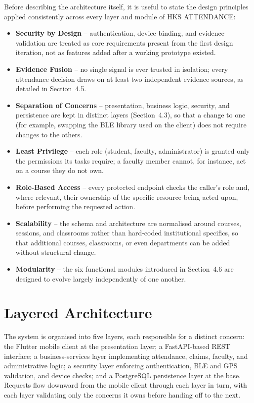 \documentclass[12pt, a4paper, oneside]{report}
\begin{document}
Before describing the architecture itself, it is useful to state the design principles applied consistently across every layer and module of HKS ATTENDANCE:

\begin{itemize}
    \item \textbf{Security by Design} -- authentication, device binding, and evidence validation are treated as core requirements present from the first design iteration, not as features added after a working prototype existed.
    \item \textbf{Evidence Fusion} -- no single signal is ever trusted in isolation; every attendance decision draws on at least two independent evidence sources, as detailed in Section~4.5.
    \item \textbf{Separation of Concerns} -- presentation, business logic, security, and persistence are kept in distinct layers (Section~4.3), so that a change to one (for example, swapping the BLE library used on the client) does not require changes to the others.
    \item \textbf{Least Privilege} -- each role (student, faculty, administrator) is granted only the permissions its tasks require; a faculty member cannot, for instance, act on a course they do not own.
    \item \textbf{Role-Based Access} -- every protected endpoint checks the caller's role and, where relevant, their ownership of the specific resource being acted upon, before performing the requested action.
    \item \textbf{Scalability} -- the schema and architecture are normalised around courses, sessions, and classrooms rather than hard-coded institutional specifics, so that additional courses, classrooms, or even departments can be added without structural change.
    \item \textbf{Modularity} -- the six functional modules introduced in Section~4.6 are designed to evolve largely independently of one another.
\end{itemize}

\section{Layered Architecture}

The system is organised into five layers, each responsible for a distinct concern: the Flutter mobile client at the presentation layer; a FastAPI-based REST interface; a business-services layer implementing attendance, claims, faculty, and administrative logic; a security layer enforcing authentication, BLE and GPS validation, and device checks; and a PostgreSQL persistence layer at the base. Requests flow downward from the mobile client through each layer in turn, with each layer validating only the concerns it owns before handing off to the next.
\end{document}

